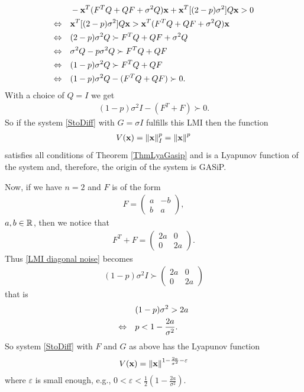 \documentclass[a4paper,12pt,twoside,BCOR=10mm]{scrbook}
\begin{document}
\begin{align*}
    &-\mathbf{x}^T(F^TQ + QF + \sigma^2 Q)\mathbf{x} + \mathbf{x}^T [(2-p)\sigma^2]Q\mathbf{x} > 0 \\
    \Leftrightarrow \quad&\mathbf{x}^T [(2-p)\sigma^2]Q\mathbf{x} > \mathbf{x}^T(F^TQ + QF + \sigma^2 Q)\mathbf{x}\\
    \Leftrightarrow \quad& (2-p)\sigma^2Q \succ F^TQ + QF + \sigma^2 Q\\
    \Leftrightarrow \quad& \sigma^2 Q - p\sigma^2 Q \succ F^TQ + QF\\
    \Leftrightarrow \quad& (1 - p)\sigma^2 Q \succ  F^TQ + QF\\
    \Leftrightarrow \quad& (1 - p)\sigma^2Q - (F^TQ + QF) \succ 0.
\end{align*}
With a choice of $Q = I$ we get
\begin{align}\label{LMI diagonal noise}
    (1 - p)\sigma^2 I - (F^T + F) \succ 0.
\end{align}
So if the system \eqref{StoDiff} with $G = \sigma I$ fulfills this LMI then the function
\begin{align*}
    V(\mathbf{x}) = \left\lVert\mathbf{x}\right\rVert_{I}^{p} = \left\lVert\mathbf{x}\right\rVert^p 
\end{align*}
satisfies all conditions of Theorem \ref{ThmLyaGasip} and is a Lyapunov function of the system and, therefore, the origin of the system is GASiP.

Now, if we have $n = 2$ and $F$ is of the form
\begin{align*}
    F =
    \begin{pmatrix}
    a & -b\\
    b & a
    \end{pmatrix},
\end{align*}
$a,b \in \mathbb{R}^{}$, then we notice that
\begin{align*}
    F^T + F =
    \begin{pmatrix}
    2a & 0\\
    0 & 2a
    \end{pmatrix}.
\end{align*}
Thus \eqref{LMI diagonal noise} becomes
\begin{align*}
    (1 - p)\sigma^2 I \succ 
    \begin{pmatrix}
    2a & 0\\
    0 & 2a
    \end{pmatrix}
\end{align*}
that is
\begin{align*}
    &(1 - p)\sigma^2 > 2a\\
    \Leftrightarrow \quad& p < 1 - \frac{2a}{\sigma^2}.
\end{align*}
So system \eqref{StoDiff} with $F$ and $G$ as above has the Lyapunov function
\begin{align*}
    V(\mathbf{x}) = \left\lVert\mathbf{x}\right\rVert^{1 - \frac{2a}{\sigma^2} - \varepsilon}
\end{align*}
where $\varepsilon$ is small enough, e.g., $0 < \varepsilon < \frac{1}{2}\left(1 - \frac{2a}{\sigma^2}\right)$.
\end{document}
